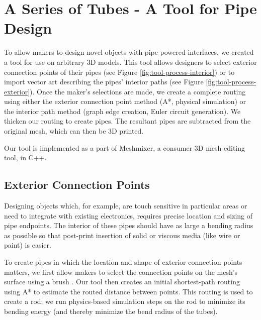 \section{A Series of Tubes - A Tool for Pipe Design}

To allow makers to design novel objects with pipe-powered interfaces, we created a tool for use on arbitrary 3D models.  This tool allows designers to select exterior connection points of their pipes (see Figure \ref{fig:tool-process-interior}) or to import vector art describing the pipes' interior paths (see Figure \ref{fig:tool-process-exterior}).  Once the maker's selections are made, we create a complete routing using either the exterior connection point method (A*, physical simulation) or the interior path method (graph edge creation, Euler circuit generation).  We thicken our routing to create pipes.   The resultant pipes are subtracted from the original mesh, which can then be 3D printed.

Our tool is implemented as a part of Meshmixer, a consumer 3D mesh editing tool, in C++.  

\subsection{Exterior Connection Points}

Designing objects which, for example, are touch sensitive in particular areas or need to integrate with existing electronics, requires precise location and sizing of pipe endpoints.  The interior of these pipes should have as large a bending radius as possible so that post-print insertion of solid or viscous media (like wire or paint) is easier.

To create pipes in which the location and shape of exterior connection points matters, we first allow makers to select the connection points on the mesh's surface using a brush  . Our tool then creates an initial shortest-path routing using A* to estimate the routed distance between points.  This routing is used to create a rod; we run physics-based simulation steps on the rod to minimize its bending energy (and thereby minimize the bend radius of the tubes).

